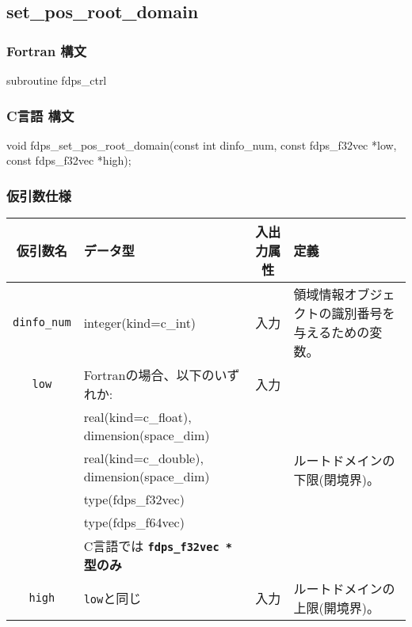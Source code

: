 \clearpage

\subsection{set\_pos\_root\_domain}
\subsubsection*{Fortran 構文}
\begin{screen}
\begin{spverbatim}
subroutine fdps_ctrl%
\end{spverbatim}
\end{screen}

\subsubsection*{C言語 構文}
\begin{screen}
\begin{spverbatim}
void fdps_set_pos_root_domain(const int dinfo_num,
                              const fdps_f32vec *low,
                              const fdps_f32vec *high);
\end{spverbatim}
\end{screen}

\subsubsection*{仮引数仕様}
\begin{table}[h]
\begin{tabularx}{\linewidth}{cp{8cm}cX}
\toprule
\rowcolor{Snow2}
仮引数名 & データ型 & 入出力属性 & 定義 \\
\midrule
\texttt{dinfo\_num} & integer(kind=c\_int) & 入力 & 領域情報オブジェクトの識別番号を与えるための変数。\\
\texttt{low} & Fortranの場合、以下のいずれか: & 入力 & \multirow{6}{\hsize}{ルートドメインの下限(閉境界)。}\\
& real(kind=c\_float), dimension(space\_dim) &&\\
& real(kind=c\_double), dimension(space\_dim) &&\\
& type(fdps\_f32vec) &&\\
& type(fdps\_f64vec) &&\\
& C言語では \textbf{\texttt{fdps\_f32vec *}型のみ} &&\\
\texttt{high} & \texttt{low}と同じ & 入力 & ルートドメインの上限(開境界)。\\
\bottomrule
\end{tabularx}
\end{table}

